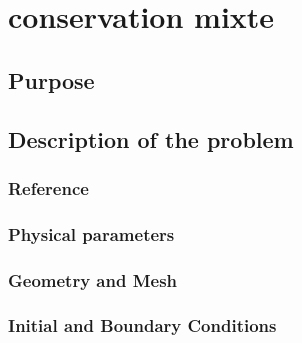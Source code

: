 \chapter{conservation mixte}
%

%
\section{Purpose}
%

%
\section{Description of the problem}
%

%
%
\subsection{Reference}
%

%
%
\subsection{Physical parameters}
%

%
%
\subsection{Geometry and Mesh}
%

%
%
\subsection{Initial and Boundary Conditions}
%

%
%

